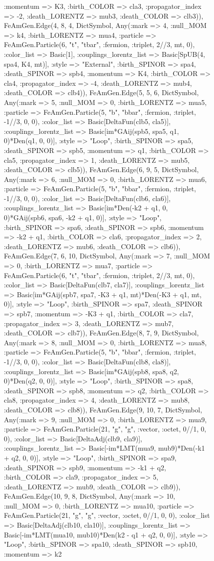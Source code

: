 \documentclass{revtex4}
\begin{document}
\begin{figure}[!htb]
\begin{center}
{:momentum => K3, :birth_COLOR => cla3, :propagator_index => -2, :death_LORENTZ => mub3, :death_COLOR => clb3)), FeAmGen.Edge(4, 8, 4, Dict{Symbol, Any}(:mark => 4, :null_MOM => k4, :birth_LORENTZ => mua4, :particle => FeAmGen.Particle(6, "t", "tbar", :fermion, :triplet, 2//3, mt, 0), :color_list => Basic[1], :couplings_lorentz_list => Basic[SpUB(4, spa4, K4, mt)], :style => "External", :birth_SPINOR => spa4, :death_SPINOR => spb4, :momentum => K4, :birth_COLOR => cla4, :propagator_index => -4, :death_LORENTZ => mub4, :death_COLOR => clb4)), FeAmGen.Edge(5, 5, 6, Dict{Symbol, Any}(:mark => 5, :null_MOM => 0, :birth_LORENTZ => mua5, :particle => FeAmGen.Particle(5, "b", "bbar", :fermion, :triplet, -1//3, 0, 0), :color_list => Basic[DeltaFun(clb5, cla5)], :couplings_lorentz_list => Basic[im*GAij(spb5, spa5, q1, 0)*Den(q1, 0, 0)], :style => "Loop", :birth_SPINOR => spa5, :death_SPINOR => spb5, :momentum => q1, :birth_COLOR => cla5, :propagator_index => 1, :death_LORENTZ => mub5, :death_COLOR => clb5)), FeAmGen.Edge(6, 9, 5, Dict{Symbol, Any}(:mark => 6, :null_MOM => 0, :birth_LORENTZ => mua6, :particle => FeAmGen.Particle(5, "b", "bbar", :fermion, :triplet, -1//3, 0, 0), :color_list => Basic[DeltaFun(clb6, cla6)], :couplings_lorentz_list => Basic[im*Den(-k2 + q1, 0, 0)*GAij(spb6, spa6, -k2 + q1, 0)], :style => "Loop", :birth_SPINOR => spa6, :death_SPINOR => spb6, :momentum => -k2 + q1, :birth_COLOR => cla6, :propagator_index => 2, :death_LORENTZ => mub6, :death_COLOR => clb6)), FeAmGen.Edge(7, 6, 10, Dict{Symbol, Any}(:mark => 7, :null_MOM => 0, :birth_LORENTZ => mua7, :particle => FeAmGen.Particle(6, "t", "tbar", :fermion, :triplet, 2//3, mt, 0), :color_list => Basic[DeltaFun(clb7, cla7)], :couplings_lorentz_list => Basic[im*GAij(spb7, spa7, -K3 + q1, mt)*Den(-K3 + q1, mt, 0)], :style => "Loop", :birth_SPINOR => spa7, :death_SPINOR => spb7, :momentum => -K3 + q1, :birth_COLOR => cla7, :propagator_index => 3, :death_LORENTZ => mub7, :death_COLOR => clb7)), FeAmGen.Edge(8, 7, 9, Dict{Symbol, Any}(:mark => 8, :null_MOM => 0, :birth_LORENTZ => mua8, :particle => FeAmGen.Particle(5, "b", "bbar", :fermion, :triplet, -1//3, 0, 0), :color_list => Basic[DeltaFun(clb8, cla8)], :couplings_lorentz_list => Basic[im*GAij(spb8, spa8, q2, 0)*Den(q2, 0, 0)], :style => "Loop", :birth_SPINOR => spa8, :death_SPINOR => spb8, :momentum => q2, :birth_COLOR => cla8, :propagator_index => 4, :death_LORENTZ => mub8, :death_COLOR => clb8)), FeAmGen.Edge(9, 10, 7, Dict{Symbol, Any}(:mark => 9, :null_MOM => 0, :birth_LORENTZ => mua9, :particle => FeAmGen.Particle(21, "g", "g", :vector, :octet, 0//1, 0, 0), :color_list => Basic[DeltaAdj(clb9, cla9)], :couplings_lorentz_list => Basic[-im*LMT(mua9, mub9)*Den(-k1 + q2, 0, 0)], :style => "Loop", :birth_SPINOR => spa9, :death_SPINOR => spb9, :momentum => -k1 + q2, :birth_COLOR => cla9, :propagator_index => 5, :death_LORENTZ => mub9, :death_COLOR => clb9)), FeAmGen.Edge(10, 9, 8, Dict{Symbol, Any}(:mark => 10, :null_MOM => 0, :birth_LORENTZ => mua10, :particle => FeAmGen.Particle(21, "g", "g", :vector, :octet, 0//1, 0, 0), :color_list => Basic[DeltaAdj(clb10, cla10)], :couplings_lorentz_list => Basic[-im*LMT(mua10, mub10)*Den(k2 - q1 + q2, 0, 0)], :style => "Loop", :birth_SPINOR => spa10, :death_SPINOR => spb10, :momentum => k2 }
\end{center}
\end{figure}
\end{document}
